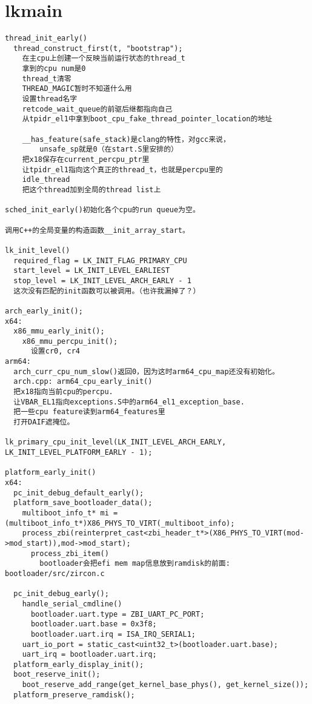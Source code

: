 \section{lkmain}
\begin{verbatim}
thread_init_early()
  thread_construct_first(t, "bootstrap");
    在主cpu上创建一个反映当前运行状态的thread_t
    拿到的cpu num是0
    thread_t清零
    THREAD_MAGIC暂时不知道什么用
    设置thread名字
    retcode_wait_queue的前驱后继都指向自己
    从tpidr_el1中拿到boot_cpu_fake_thread_pointer_location的地址

    __has_feature(safe_stack)是clang的特性，对gcc来说，
        unsafe_sp就是0（在start.S里安排的）
    把x18保存在current_percpu_ptr里
    让tpidr_el1指向这个真正的thread_t，也就是percpu里的
    idle_thread
    把这个thread加到全局的thread list上

sched_init_early()初始化各个cpu的run queue为空。

调用C++的全局变量的构造函数__init_array_start。

lk_init_level()
  required_flag = LK_INIT_FLAG_PRIMARY_CPU
  start_level = LK_INIT_LEVEL_EARLIEST
  stop_level = LK_INIT_LEVEL_ARCH_EARLY - 1
  这次没有匹配的init函数可以被调用。（也许我漏掉了？）

arch_early_init();
x64:
  x86_mmu_early_init();
    x86_mmu_percpu_init();
      设置cr0, cr4
arm64:
  arch_curr_cpu_num_slow()返回0，因为这时arm64_cpu_map还没有初始化。
  arch.cpp: arm64_cpu_early_init()
  把x18指向当前cpu的percpu.
  让VBAR_EL1指向exceptions.S中的arm64_el1_exception_base.
  把一些cpu feature读到arm64_features里
  打开DAIF遮掩位。

lk_primary_cpu_init_level(LK_INIT_LEVEL_ARCH_EARLY, LK_INIT_LEVEL_PLATFORM_EARLY - 1);

platform_early_init()
x64:
  pc_init_debug_default_early();
  platform_save_bootloader_data();
    multiboot_info_t* mi = (multiboot_info_t*)X86_PHYS_TO_VIRT(_multiboot_info);
    process_zbi(reinterpret_cast<zbi_header_t*>(X86_PHYS_TO_VIRT(mod->mod_start)),mod->mod_start);
      process_zbi_item()
        bootloader会把efi mem map信息放到ramdisk的前面: bootloader/src/zircon.c

  pc_init_debug_early();
    handle_serial_cmdline()
      bootloader.uart.type = ZBI_UART_PC_PORT;
      bootloader.uart.base = 0x3f8;
      bootloader.uart.irq = ISA_IRQ_SERIAL1;
    uart_io_port = static_cast<uint32_t>(bootloader.uart.base);
    uart_irq = bootloader.uart.irq;
  platform_early_display_init();
  boot_reserve_init();
    boot_reserve_add_range(get_kernel_base_phys(), get_kernel_size());
  platform_preserve_ramdisk();


\end{verbatim}

